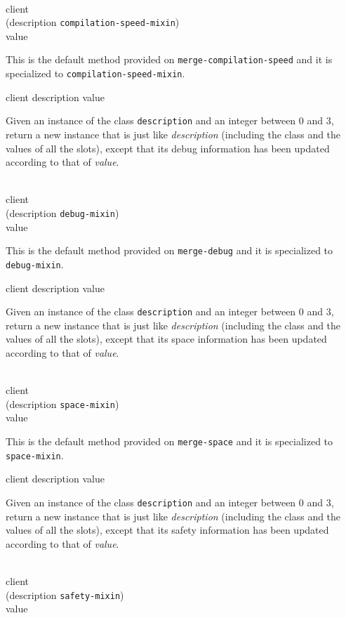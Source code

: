 \\
           {client\\
            (description {\tt compilation-speed-mixin})\\
            value}

This is the default method provided on
\texttt{merge-compilation-speed} and it is specialized to
\texttt{compilation-speed-mixin}.

 {client description value}

Given an instance of the class \texttt{description} and an
integer between $0$ and $3$, return a new instance that is just like
\textit{description} (including the class and the values of
all the slots), except that its debug information has been updated
according to that of \textit{value}.

\\
           {client\\
            (description {\tt debug-mixin})\\
            value}

This is the default method provided on \texttt{merge-debug} and it is
specialized to \texttt{debug-mixin}.

 {client description value}

Given an instance of the class \texttt{description} and an
integer between $0$ and $3$, return a new instance that is just like
\textit{description} (including the class and the values of
all the slots), except that its space information has been updated
according to that of \textit{value}.

\\
           {client\\
            (description {\tt space-mixin})\\
            value}

This is the default method provided on \texttt{merge-space} and it is
specialized to \texttt{space-mixin}.

 {client description value}

Given an instance of the class \texttt{description} and an
integer between $0$ and $3$, return a new instance that is just like
\textit{description} (including the class and the values of
all the slots), except that its safety information has been updated
according to that of \textit{value}.

\\
           {client\\
            (description {\tt safety-mixin})\\
            value}

